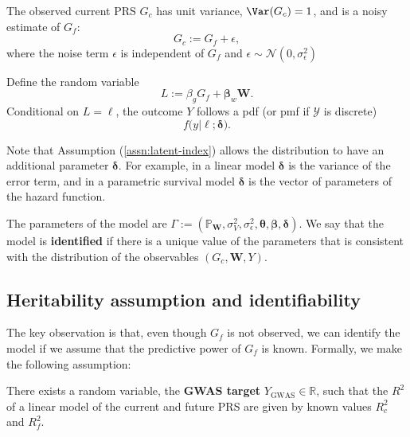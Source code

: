 \documentclass[12pt]{article}
\begin{document}
\begin{assumption}
    The observed current PRS $G_c$ has unit variance, $\Var(G_c) = 1$, and is a noisy estimate of $G_f$:
    \begin{equation}
        G_c := G_f + \epsilon,
        \label{eq:Gc}
    \end{equation}
    where the noise term $\epsilon$ is independent of $G_f$ and $\epsilon \sim \mathcal{N}(0, \sigma_\epsilon^2)$
    \label{assn:noisy-pgi}
\end{assumption}

\begin{assumption}
    \label{assn:latent-index}
    Define the random variable
    \[
        L := \beta_g G_f + \boldsymbol{\beta}_w \boldsymbol{W}.
    \]
    Conditional on \(L = \ell\), the outcome \(Y\) follows a pdf (or pmf if \(\mathcal{Y}\) is discrete)
    \[
        f\bigl(y | \ell; \boldsymbol{\delta}\bigr).
    \]
\end{assumption}

Note that Assumption (\ref{assn:latent-index}) allows the distribution to have an additional parameter $\boldsymbol{\delta}$. For example, in a linear model $\boldsymbol{\delta}$ is the variance of the error term, and in a parametric survival model $\boldsymbol{\delta}$ is the vector of parameters of the hazard function.

The parameters of the model are $\Gamma := (\mathbb{P}_{\boldsymbol W}, \sigma^2_V, \sigma^2_\epsilon, \boldsymbol{\theta}, \boldsymbol{\beta}, \boldsymbol{\delta})$. We say that the model is \textbf{identified} if there is a unique value of the parameters that is consistent with the distribution of the observables $\left(G_c, \boldsymbol W, Y\right)$.


\subsection{Heritability assumption and identifiability}
The key observation is that, even though $G_f$ is not observed, we can identify the model if we assume that the predictive power of $G_f$ is known. Formally, we make the following assumption:

\begin{assumption}[Heritability]
    There exists a random variable, the \textbf{GWAS target} $Y_{\text{GWAS}} \in \mathbb{R}$, such that the $R^2$ of a linear model of the current and future PRS are given by known values $R^2_c$ and $R^2_f$.
    \label{assn:known_heritability}
\end{assumption}
\end{document}

